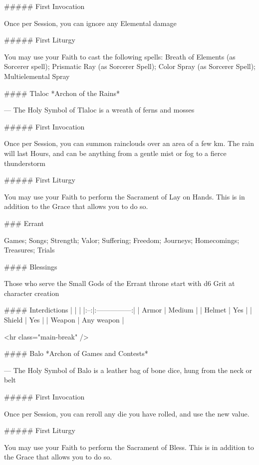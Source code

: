 ##### First Invocation

Once per Session, you can ignore any Elemental damage

##### First Liturgy

You may use your Faith to cast the following spells: Breath of Elements (as Sorcerer spell); Prismatic Ray (as Sorcerer Spell); Color Spray (as Sorcerer Spell); Multielemental Spray




#### Tlaloc
*Archon of the Rains*

---
The Holy Symbol of Tlaloc is a wreath of ferns and mosses

##### First Invocation

Once per Session, you can summon rainclouds over an area of a few km.  The rain will last Hours, and can be anything from a gentle mist or fog to a fierce thunderstorm

##### First Liturgy

You may use your Faith to perform the Sacrament of Lay on Hands.  This is in addition to the Grace that allows you to do so.





### Errant



Games; Songs; Strength; Valor; Suffering; Freedom; Journeys; Homecomings; Treasures; Trials



#### Blessings

Those who serve the Small Gods of the Errant throne start with d6 Grit at character creation

#### Interdictions
| | |
|:--:|:---------------:|
| Armor | Medium |
| Helmet | Yes |
| Shield | Yes |
| Weapon | Any weapon |

<hr class="main-break" />

#### Balo
*Archon of Games and Contests*

---
The Holy Symbol of Balo is a leather bag of bone dice, hung from the neck or belt

##### First Invocation

Once per Session, you can reroll any die you have rolled, and use the new value.

##### First Liturgy

You may use your Faith to perform the Sacrament of Bless.  This is in addition to the Grace that allows you to do so.




